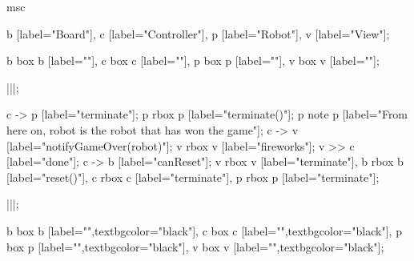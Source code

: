 \begin{msc}
msc
{

b [label="Board"],
c [label="Controller"],
p [label="Robot"],
v [label="View"];

b box b [label=""],
c box c [label=""],
p box p [label=""],
v box v [label=""];

|||;

c -> p [label="terminate"];
p rbox p [label="terminate()"];
p note p [label="From here on, robot is the robot that has won the game"];
c -> v [label="notifyGameOver(robot)"];
v rbox v [label="fireworks"];
v >> c [label="done"];
c -> b [label="canReset"];
v rbox v [label="terminate"],
b rbox b [label="reset()"],
c rbox c [label="terminate"],
p rbox p [label="terminate"];


|||;

b box b [label="",textbgcolor="black"],
c box c [label="",textbgcolor="black"],
p box p [label="",textbgcolor="black"],
v box v [label="",textbgcolor="black"];

}
\end{msc}

